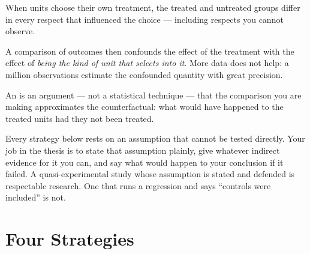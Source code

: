 \begin{definitionbox}
When units choose their own treatment, the treated and untreated groups differ
in every respect that influenced the choice --- including respects you cannot
observe.

\medskip
A comparison of outcomes then confounds the effect of the treatment with the
effect of \emph{being the kind of unit that selects into it}. More data does
not help: a million observations estimate the confounded quantity with great
precision.
\end{definitionbox}

\begin{conceptbox}
An  is an argument --- not a statistical
technique --- that the comparison you are making approximates the
counterfactual: what would have happened to the treated units had they not been
treated.

\medskip
Every strategy below rests on an assumption that cannot be tested directly.
Your job in the thesis is to state that assumption plainly, give whatever
indirect evidence for it you can, and say what would happen to your conclusion
if it failed. A quasi-experimental study whose assumption is stated and
defended is respectable research. One that runs a regression and says
``controls were included'' is not.
\end{conceptbox}

\section{Four Strategies}

